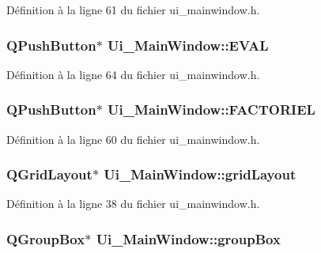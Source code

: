 \-Définition à la ligne 61 du fichier ui\-\_\-mainwindow.\-h.

\hypertarget{class_ui___main_window_aafa19488033af699d2e20192f189de49}{
\subsubsection[{\-E\-V\-A\-L}]{\setlength{\rightskip}{0pt plus 5cm}\-Q\-Push\-Button$\ast$ {\bf \-Ui\-\_\-\-Main\-Window\-::\-E\-V\-A\-L}}}\label{class_ui___main_window_aafa19488033af699d2e20192f189de49}


\-Définition à la ligne 64 du fichier ui\-\_\-mainwindow.\-h.

\hypertarget{class_ui___main_window_a3b9631153562751675ef6fe58d72fe68}{
\subsubsection[{\-F\-A\-C\-T\-O\-R\-I\-E\-L}]{\setlength{\rightskip}{0pt plus 5cm}\-Q\-Push\-Button$\ast$ {\bf \-Ui\-\_\-\-Main\-Window\-::\-F\-A\-C\-T\-O\-R\-I\-E\-L}}}\label{class_ui___main_window_a3b9631153562751675ef6fe58d72fe68}


\-Définition à la ligne 60 du fichier ui\-\_\-mainwindow.\-h.

\hypertarget{class_ui___main_window_a525ed3c5fe0784ac502ee222fba4e205}{
\subsubsection[{grid\-Layout}]{\setlength{\rightskip}{0pt plus 5cm}\-Q\-Grid\-Layout$\ast$ {\bf \-Ui\-\_\-\-Main\-Window\-::grid\-Layout}}}\label{class_ui___main_window_a525ed3c5fe0784ac502ee222fba4e205}


\-Définition à la ligne 38 du fichier ui\-\_\-mainwindow.\-h.

\hypertarget{class_ui___main_window_aef7cb3be8cecfc9aaf98f036a98781ce}{
\subsubsection[{group\-Box}]{\setlength{\rightskip}{0pt plus 5cm}\-Q\-Group\-Box$\ast$ {\bf \-Ui\-\_\-\-Main\-Window\-::group\-Box}}}\label{class_ui___main_window_aef7cb3be8cecfc9aaf98f036a98781ce}


